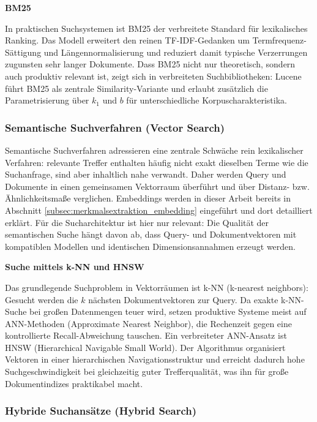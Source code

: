 \textbf{BM25}

In praktischen Suchsystemen ist BM25 der verbreitete Standard für lexikalisches
Ranking.
Das Modell erweitert den reinen TF-IDF-Gedanken um Termfrequenz-Sättigung und
Längennormalisierung und reduziert damit typische Verzerrungen zugunsten sehr langer
Dokumente. Dass BM25 nicht nur theoretisch, sondern auch produktiv relevant ist, zeigt sich in
verbreiteten Suchbibliotheken: Lucene führt BM25 als zentrale Similarity-Variante
und erlaubt zusätzlich die Parametrisierung über \(k_1\) und \(b\) für
unterschiedliche Korpuscharakteristika. \cite{lucene_similarity,robertson2009bm25}

\subsubsection{Semantische Suchverfahren (Vector Search)}

Semantische Suchverfahren adressieren eine zentrale Schwäche rein lexikalischer
Verfahren: relevante Treffer enthalten häufig nicht exakt dieselben Terme wie die
Suchanfrage, sind aber inhaltlich nahe verwandt.
Daher werden Query und Dokumente in einen gemeinsamen Vektorraum überführt und über
Distanz- bzw. Ähnlichkeitsmaße verglichen. Embeddings werden in dieser Arbeit bereits in Abschnitt
\ref{subsec:merkmalsextraktion_embedding} eingeführt und dort detailliert erklärt.
Für die Sucharchitektur ist hier nur relevant: Die Qualität der semantischen Suche
hängt davon ab, dass Query- und Dokumentvektoren mit kompatiblen Modellen und
identischen Dimensionsannahmen erzeugt werden. \cite{elastic_knn_search}  

\textbf{Suche mittels k-NN und HNSW}

Das grundlegende Suchproblem in Vektorräumen ist k-NN (k-nearest neighbors):
Gesucht werden die \(k\) nächsten Dokumentvektoren zur Query.
Da exakte k-NN-Suche bei großen Datenmengen teuer wird, setzen produktive Systeme
meist auf ANN-Methoden (Approximate Nearest Neighbor), die Rechenzeit gegen eine
kontrollierte Recall-Abweichung tauschen. Ein verbreiteter ANN-Ansatz ist HNSW (Hierarchical Navigable Small World).
Der Algorithmus organisiert Vektoren in einer hierarchischen
Navigationsstruktur und erreicht dadurch hohe Suchgeschwindigkeit bei gleichzeitig
guter Trefferqualität, was ihn für große Dokumentindizes praktikabel macht.
\cite{malkov2018hnsw,elastic_knn_search}

\subsubsection{Hybride Suchansätze (Hybrid Search)}
\label{subsec:hybrid}

